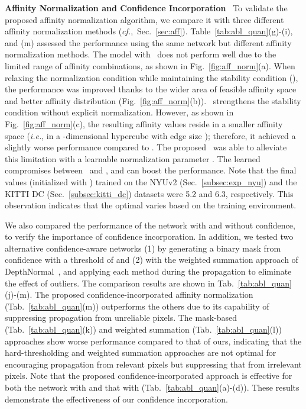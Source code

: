 \documentclass[runningheads]{llncs}
\newcommand{\figref}[1]{Fig.~\ref{#1}}
\newcommand{\tabref}[1]{Tab.~\ref{#1}}
\newcommand{\secref}[1]{Sec.~\ref{#1}}
\newcommand{\Tabref}[1]{Table~\ref{#1}}
\newcommand{\ie}{\textit{i.e.}}
\newcommand{\absSum}{}
\newcommand{\absSumStar}{}
\newcommand{\tanhC}{}
\newcommand{\tgAbsSumStar}{}
\begin{document}
\noindent \textbf{Affinity Normalization and Confidence Incorporation} \ 
To validate the proposed affinity normalization algorithm, we compare it with three different affinity normalization methods (\textit{cf.},~\secref{sec:aff}). 
\Tabref{tab:abl_quan}(g)-(i), and (m) assessed the performance using the same network but different affinity normalization methods. 
The model with \absSum~does not perform well due to the limited range of affinity combinations, as shown in \figref{fig:aff_norm}(a). 
When relaxing the normalization condition while maintaining the stability condition (\absSumStar), the performance was improved thanks to the wider area of feasible affinity space and better affinity distribution (\figref{fig:aff_norm}(b)). 
\tanhC~strengthens the stability condition without explicit normalization. 
However, as shown in \figref{fig:aff_norm}(c), the resulting affinity values reside in a smaller affinity space (\ie, in a -dimensional hypercube with edge size ); therefore, it achieved a slightly worse performance compared to \absSumStar. 
The proposed \tgAbsSumStar~was able to alleviate this limitation with a learnable normalization parameter . 
The learned  compromises between \absSumStar~and \tanhC, and can boost the performance. 
Note that the final  values (initialized with ) trained on the NYUv2 (\secref{subsec:exp_nyu}) and the KITTI DC (\secref{subsec:kitti_dc}) datasets were 5.2 and 6.3, respectively. 
This observation indicates that the optimal  varies based on the training environment. 




We also compared the performance of the network with and without confidence, to verify the importance of confidence incorporation. 
In addition, we tested two alternative confidence-aware networks (1) by generating a binary mask from confidence with a threshold of  and (2) with the weighted summation approach of DepthNormal~\cite{xu2019depth}, and applying each method during the propagation to eliminate the effect of outliers. 
The comparison results are shown in \tabref{tab:abl_quan}(j)-(m). 
The proposed confidence-incorporated affinity normalization (\tabref{tab:abl_quan}(m)) outperforms the others due to its capability of suppressing propagation from unreliable pixels.
The mask-based (\tabref{tab:abl_quan}(k)) and weighted summation (\tabref{tab:abl_quan}(l)) approaches show worse performance compared to that of ours, indicating that the hard-thresholding and weighted summation approaches are not optimal for encouraging propagation from relevant pixels but suppressing that from irrelevant pixels. 
Note that the proposed confidence-incorporated approach is effective for both the network with  and that with  (\tabref{tab:abl_quan}(a)-(d)). 
These results demonstrate the effectiveness of our confidence incorporation.
\end{document}
